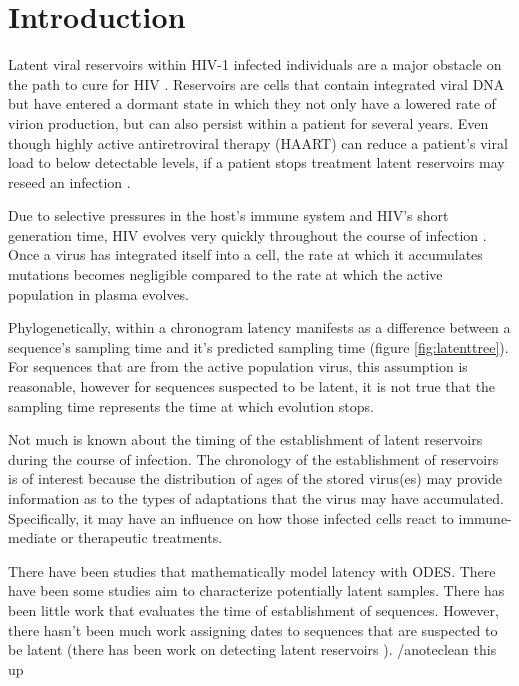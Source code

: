 \section{Introduction} \label{sec:intro}
Latent viral reservoirs within HIV-1 infected individuals are a major obstacle on the path to cure for HIV \citep{Pace11}. Reservoirs are cells that contain integrated viral DNA but have entered a dormant state in which they not only have a lowered rate of virion production, but can also persist within a patient for several years. Even though highly active antiretroviral therapy (HAART) can reduce a patient's viral load to below detectable levels, if a patient stops treatment latent reservoirs may reseed an infection \citep{Joos08, Pomerantz03, Richman09}.

Due to selective pressures in the host's immune system and HIV's short generation time, HIV evolves very quickly throughout the course of infection \citep{Alizon13, Shankarappa99, Rambaut04}. Once a virus has integrated itself into a cell, the rate at which it accumulates mutations becomes negligible compared to the rate at which the active population in plasma evolves.

Phylogenetically, within a chronogram latency manifests as a difference between a sequence's sampling time and it's predicted sampling time (figure \ref{fig:latenttree}). For sequences that are from the active population virus, this assumption is reasonable, however for sequences suspected to be latent, it is not true that the sampling time represents the time at which evolution stops.

Not much is known about the timing of the establishment of latent reservoirs during the course of infection. The chronology of the establishment of reservoirs is of interest because the distribution of ages of the stored virus(es) may provide information as to the types of adaptations that the virus may have accumulated. Specifically, it may have an influence on how those infected cells react to immune-mediate or therapeutic treatments. 

There have been studies that mathematically model latency with ODES. There have been some studies aim to characterize potentially latent samples. There has been little work that evaluates the time of establishment of sequences. However, there hasn't been much work assigning dates to sequences that are suspected to be latent (there has been work on detecting latent reservoirs \cite{Immonen14}). /anote{clean this up}

